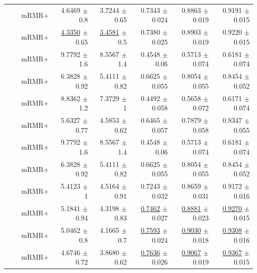 \begin{longtable}{llp{}rrrrr}
 &  & mRMR+ & 4.6469 {\scriptsize $\pm$ 0.8} & 3.7244 {\scriptsize $\pm$ 0.65} & 0.7343 {\scriptsize $\pm$ 0.024} & 0.8863 {\scriptsize $\pm$ 0.019} & 0.9191 {\scriptsize $\pm$ 0.015} \\
 &  & mRMR+ & \underline{4.3350} {\scriptsize $\pm$ 0.65} & \underline{3.4581} {\scriptsize $\pm$ 0.5} & 0.7380 {\scriptsize $\pm$ 0.025} & 0.8903 {\scriptsize $\pm$ 0.019} & 0.9220 {\scriptsize $\pm$ 0.015} \\
 &  & mRMR+ & 9.7792 {\scriptsize $\pm$ 1.6} & 8.5567 {\scriptsize $\pm$ 1.4} & 0.4548 {\scriptsize $\pm$ 0.06} & 0.5713 {\scriptsize $\pm$ 0.074} & 0.6181 {\scriptsize $\pm$ 0.074} \\
 &  & mRMR+ & 6.3828 {\scriptsize $\pm$ 0.92} & 5.4111 {\scriptsize $\pm$ 0.82} & 0.6625 {\scriptsize $\pm$ 0.055} & 0.8054 {\scriptsize $\pm$ 0.055} & 0.8454 {\scriptsize $\pm$ 0.052} \\
 &  & mRMR+ & 8.8362 {\scriptsize $\pm$ 1.2} & 7.3729 {\scriptsize $\pm$ 1} & 0.4492 {\scriptsize $\pm$ 0.058} & 0.5658 {\scriptsize $\pm$ 0.072} & 0.6171 {\scriptsize $\pm$ 0.074} \\
 &  & mRMR+ & 5.6327 {\scriptsize $\pm$ 0.77} & 4.5853 {\scriptsize $\pm$ 0.62} & 0.6465 {\scriptsize $\pm$ 0.057} & 0.7879 {\scriptsize $\pm$ 0.058} & 0.8347 {\scriptsize $\pm$ 0.055} \\
 &  & mRMR+ & 9.7792 {\scriptsize $\pm$ 1.6} & 8.5567 {\scriptsize $\pm$ 1.4} & 0.4548 {\scriptsize $\pm$ 0.06} & 0.5713 {\scriptsize $\pm$ 0.074} & 0.6181 {\scriptsize $\pm$ 0.074} \\
 &  & mRMR+ & 6.3828 {\scriptsize $\pm$ 0.92} & 5.4111 {\scriptsize $\pm$ 0.82} & 0.6625 {\scriptsize $\pm$ 0.055} & 0.8054 {\scriptsize $\pm$ 0.055} & 0.8454 {\scriptsize $\pm$ 0.052} \\
 &  & mRMR+ & 5.4123 {\scriptsize $\pm$ 1} & 4.5164 {\scriptsize $\pm$ 0.91} & 0.7243 {\scriptsize $\pm$ 0.032} & 0.8659 {\scriptsize $\pm$ 0.031} & 0.9172 {\scriptsize $\pm$ 0.016} \\
 &  & mRMR+ & 5.1841 {\scriptsize $\pm$ 0.94} & 4.3198 {\scriptsize $\pm$ 0.83} & \underline{0.7462} {\scriptsize $\pm$ 0.027} & \underline{0.8881} {\scriptsize $\pm$ 0.023} & \underline{0.9270} {\scriptsize $\pm$ 0.015} \\
 &  & mRMR+ & 5.0462 {\scriptsize $\pm$ 0.8} & 4.1665 {\scriptsize $\pm$ 0.7} & \underline{0.7593} {\scriptsize $\pm$ 0.024} & \underline{0.9030} {\scriptsize $\pm$ 0.018} & \underline{0.9308} {\scriptsize $\pm$ 0.016} \\
 &  & mRMR+ & 4.6746 {\scriptsize $\pm$ 0.72} & 3.8680 {\scriptsize $\pm$ 0.62} & \underline{0.7636} {\scriptsize $\pm$ 0.026} & \underline{0.9067} {\scriptsize $\pm$ 0.019} & \underline{0.9367} {\scriptsize $\pm$ 0.015} \\

\end{longtable}
